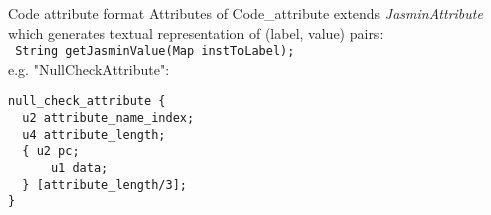 \begin{slide}{Code attribute format}
Attributes of Code\_attribute extends {\em JasminAttribute}
which generates textual representation of (label, value)
pairs:\\
\footnotesize{\verb$ String getJasminValue(Map instToLabel); $} \\
e.g. "NullCheckAttribute":
\footnotesize{
\begin{verbatim}
null_check_attribute {
  u2 attribute_name_index;
  u4 attribute_length;
  { u2 pc;
      u1 data;
  } [attribute_length/3];
}
\end{verbatim}
}
\end{slide}
